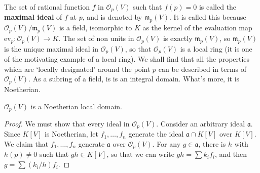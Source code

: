 The set of rational function $f$ in $\mathcal{O}_p(V)$ such that $f(p) = 0$ is called the {\bf maximal ideal} of $f$ at $p$, and is denoted by $\mathfrak{m}_p(V)$. It is called this because $\mathcal{O}_p(V)/\mathfrak{m}_p(V)$ is a field, isomorphic to $K$ as the kernel of the evaluation map $\text{ev}_p: \mathcal{O}_p(V) \to K$. The set of non units in $\mathcal{O}_p(V)$ is exactly $\mathfrak{m}_p(V)$, so $\mathfrak{m}_p(V)$ is the unique maximal ideal in $\mathcal{O}_p(V)$, so that $\mathcal{O}_p(V)$ is a local ring (it is one of the motivating example of a local ring). We shall find that all the properties which are `locally designated' around the point $p$ can be described in terms of $\mathcal{O}_p(V)$. As a subring of a field, is is an integral domain. What's more, it is Noetherian.

\begin{prop}
    $\mathcal{O}_p(V)$ is a Noetherian local domain.
\end{prop}
\begin{proof}
    We must show that every ideal in $\mathcal{O}_p(V)$. Consider an arbitrary ideal $\mathfrak{a}$. Since $K[V]$ is Noetherian, let $f_1, \dots, f_n$ generate the ideal $\mathfrak{a} \cap K[V]$ over $K[V]$. We claim that $f_1, \dots, f_n$ generate $\mathfrak{a}$ over $\mathcal{O}_p(V)$. For any $g \in \mathfrak{a}$, there is $h$ with $h(p) \neq 0$ such that $gh \in K[V]$, so that we can write $gh = \sum k_if_i$, and then $g = \sum (k_i/h) f_i$.
\end{proof}

